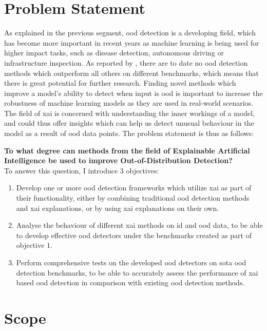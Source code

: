 \documentclass[UKenglish]{uiomasterthesis} %
\theoremstyle{definition}
\begin{document}
\section{Problem Statement} \label{section:problemstatement}

As explained in the previous segment, \ac{ood} detection is a developing field, which has become more important in recent years as machine learning is being used for higher impact tasks, such as disease detection, autonomous driving or infrastructure inspection. As reported by \cite{openood15}, there are to date no \ac{ood} detection methods which outperform all others on different benchmarks, which means that there is great potential for further research. Finding novel methods which improve a model's ability to detect when input is \ac{ood} is important to increase the robustness of machine learning models as they are used in real-world scenarios. The field of \ac{xai} is concerned with understanding the inner workings of a model, and could thus offer insights which can help us detect unusual behaviour in the model as a result of \ac{ood} data points. The problem statement is thus as follows:

\textbf{To what degree can methods from the field of Explainable Artificial Intelligence be used to improve Out-of-Distribution Detection?}
\\

To answer this question, I introduce 3 objectives:

\begin{enumerate}
    \item Develop one or more \ac{ood} detection frameworks which utilize \ac{xai} as part of their functionality, either by combining traditional \ac{ood} detection methods and \ac{xai} explanations, or by using \ac{xai} explanations on their own.
    \item Analyse the behaviour of different \ac{xai} methods on \ac{id} and \ac{ood} data, to be able to develop effective \ac{ood} detectors under the benchmarks created as part of objective 1.
    \item Perform comprehensive tests on the developed \ac{ood} detectors on \ac{sota} \ac{ood} detection benchmarks, to be able to accurately assess the performance of \ac{xai} based \ac{ood} detection in comparison with existing \ac{ood} detection methods.
\end{enumerate}

\section{Scope} \label{section:scope}
\end{document}
